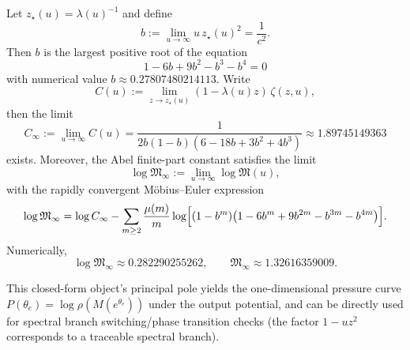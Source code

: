 

\begin{proposition}\label{prop:real-input-40-logM-infty}
Let $z_\star(u)=\lambda(u)^{-1}$ and define
\[
b:=\lim_{u\to\infty}u\,z_\star(u)^2=\frac{1}{c^2}.
\]
Then $b$ is the largest positive root of the equation
\[
1-6b+9b^2-b^3-b^4=0
\]
with numerical value $b\approx 0.27807480214113$. Write
\[
C(u):=\lim_{z\to z_\star(u)}(1-\lambda(u)z)\,\zeta(z,u),
\]
then the limit
\[
C_\infty:=\lim_{u\to\infty}C(u)=\frac{1}{2b(1-b)(6-18b+3b^2+4b^3)}\approx 1.89745149363
\]
exists. Moreover, the Abel finite-part constant satisfies the limit
\[
\log\mathfrak{M}_\infty:=\lim_{u\to\infty}\log\mathfrak{M}(u),
\]
with the rapidly convergent M\"obius--Euler expression
\[
\log\mathfrak{M}_\infty
=\log C_\infty
-\sum_{m\ge 2}\frac{\mu(m)}{m}\log\Bigl[(1-b^m)\bigl(1-6b^m+9b^{2m}-b^{3m}-b^{4m}\bigr)\Bigr].
\]
Numerically,
\[
\log\mathfrak{M}_\infty\approx 0.282290255262,\qquad
\mathfrak{M}_\infty\approx 1.32616359009.
\]
\end{proposition}
This closed-form object's principal pole yields the one-dimensional pressure curve $P(\theta_e)=\log\rho(M(e^{\theta_e}))$ under the output potential, and can be directly used for spectral branch switching/phase transition checks (the factor $1-uz^2$ corresponds to a traceable spectral branch).

